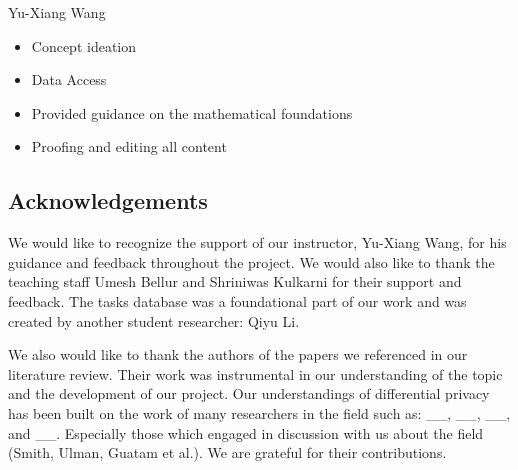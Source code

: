 \documentclass[12pt,letterpaper]{article}
\begin{document}
Yu-Xiang Wang
\begin{itemize}
  \item Concept ideation
  \item Data Access
  \item Provided guidance on the mathematical foundations
  \item Proofing and editing all content
\end{itemize}


\subsection{Acknowledgements}

We would like to recognize the support of our instructor, Yu-Xiang Wang, for his guidance and feedback throughout the project. We would also like to thank the teaching staff Umesh Bellur and Shriniwas Kulkarni for their support and feedback. The tasks database was a foundational part of our work and was created by another student researcher: Qiyu Li. 

We also would like to thank the authors of the papers we referenced in our literature review. Their work was instrumental in our understanding of the topic and the development of our project. Our understandings of differential privacy has been built on the work of many researchers in the field such as: \_\_, \_\_, \_\_, and \_\_. Especially those which engaged in discussion with us about the field (Smith, Ulman, Guatam et al.). We are grateful for their contributions.



%

\makereference







\end{document}
